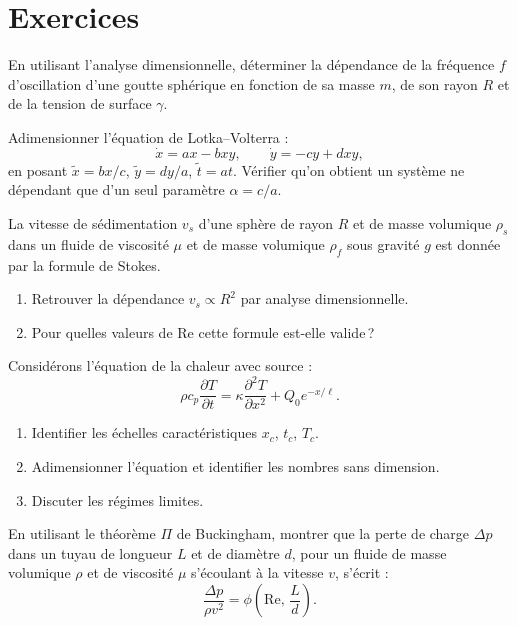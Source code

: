 \section{Exercices}

\begin{exercice}
En utilisant l'analyse dimensionnelle, d\'eterminer la d\'ependance
de la fr\'equence $f$ d'oscillation d'une goutte sph\'erique en
fonction de sa masse $m$, de son rayon $R$ et de la tension de
surface $\gamma$.
\end{exercice}

\begin{exercice}
Adimensionner l'\'equation de Lotka--Volterra :
\[
  \dot{x} = ax - bxy, \qquad \dot{y} = -cy + dxy,
\]
en posant $\tilde{x}=bx/c$, $\tilde{y}=dy/a$, $\tilde{t}=at$.
V\'erifier qu'on obtient un syst\`eme ne d\'ependant que d'un seul
param\`etre $\alpha = c/a$.
\end{exercice}

\begin{exercice}
La vitesse de s\'edimentation $v_s$ d'une sph\`ere de rayon $R$ et de
masse volumique $\rho_s$ dans un fluide de viscosit\'e $\mu$ et de
masse volumique $\rho_f$ sous gravit\'e $g$ est donn\'ee par la
formule de Stokes.
\begin{enumerate}
  \item Retrouver la d\'ependance $v_s\propto R^2$ par analyse
    dimensionnelle.
  \item Pour quelles valeurs de Re cette formule est-elle valide\,?
\end{enumerate}
\end{exercice}

\begin{exercice}
Consid\'erons l'\'equation de la chaleur avec source :
\[
  \rho c_p \frac{\partial T}{\partial t}
  = \kappa\frac{\partial^2 T}{\partial x^2} + Q_0 e^{-x/\ell}.
\]
\begin{enumerate}
  \item Identifier les \'echelles caract\'eristiques $x_c$, $t_c$, $T_c$.
  \item Adimensionner l'\'equation et identifier les nombres sans dimension.
  \item Discuter les r\'egimes limites.
\end{enumerate}
\end{exercice}

\begin{exercice}
En utilisant le th\'eor\`eme $\Pi$ de Buckingham, montrer que la
perte de charge $\Delta p$ dans un tuyau de longueur $L$ et de
diam\`etre $d$, pour un fluide de masse volumique $\rho$ et de
viscosit\'e $\mu$ s'\'ecoulant \`a la vitesse $v$, s'\'ecrit :
\[
  \frac{\Delta p}{\rho v^2} = \phi\!\left(\mathrm{Re},\,\frac{L}{d}\right).
\]
\end{exercice}
